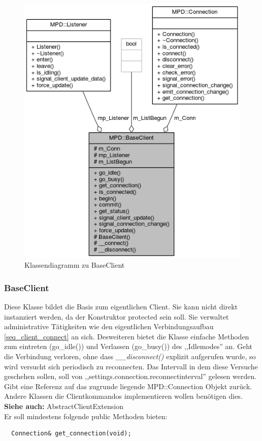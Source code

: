 \begin{figure}[htb!]
	\centering
        \includegraphics[scale=0.55]{BaseClientCollab.png}
	\caption{Klassendiagramm zu BaseClient}
	\label{collab_base_client}
\end{figure}

\subsubsection{BaseClient}
Diese Klasse bildet die Basis zum eigentlichen Client. Sie kann nicht direkt instanziert werden, da
der Konstruktor protected sein soll.
Sie verwaltet administrative Tätigkeiten wie den eigentlichen Verbindungsaufbau \ref{seq_client_connect} an sich. 
Desweiteren bietet die Klasse einfache Methoden zum eintreten (go\_idle()) und Verlassen (go\_busy()) des ,,Idlemodes'' an.
Geht die Verbindung verloren, ohne dass \emph{\_\_disconnect()} explizit aufgerufen wurde, so wird versucht sich periodisch zu reconnecten.
Das Intervall in dem diese Versuche geschehen sollen, soll von ,,settings.connection.reconnectinterval'' gelesen werden.
\\
Gibt eine Referenz auf das zugrunde liegende MPD::Connection Objekt zurück. 
Andere Klassen die Clientkommandos implementieren wollen benötigen dies.
\\
\textbf{Siehe auch:} AbstractClientExtension
\\
Er soll mindestens folgende public Methoden bieten:
\\
\begin{verbatim}
  Connection& get_connection(void);
\end{verbatim}

